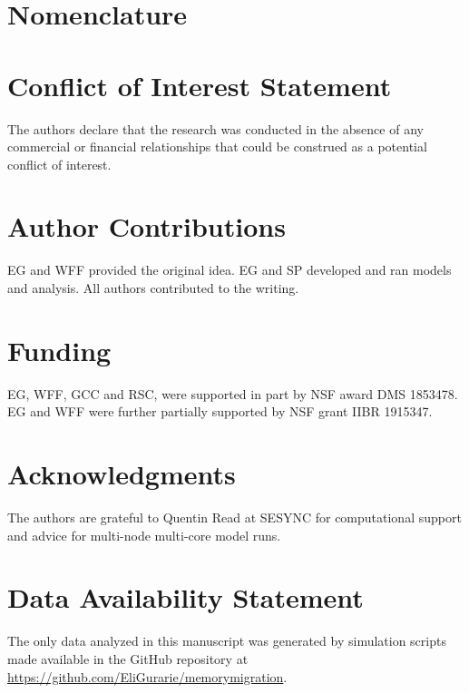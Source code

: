 \documentclass[utf8]{frontiersSCNS} %
\begin{document}
	
	
	\section{Nomenclature}
	
	
	\section*{Conflict of Interest Statement}
	
	The authors declare that the research was conducted in the absence of any commercial or financial relationships that could be construed as a potential conflict of interest.
	
	\section*{Author Contributions}
	
	EG and WFF provided the original idea. EG and SP developed and ran models and analysis. All authors contributed to the writing. 
	
	\section*{Funding}
	
	EG, WFF, GCC and RSC, were supported in part by NSF award DMS 1853478. EG and WFF were further partially supported by NSF grant IIBR 1915347. 
	
	\section*{Acknowledgments}
	The authors are grateful to Quentin Read at SESYNC for computational support and advice for multi-node multi-core model runs. 
	
	
	\section*{Data Availability Statement}
	
	The only data analyzed in this manuscript was generated by simulation scripts made available in the GitHub repository at \url{https://github.com/EliGurarie/memorymigration}. 
	
	
	
\end{document}

